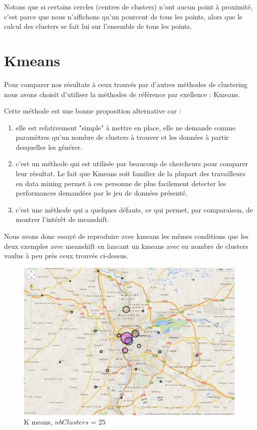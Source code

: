 Notons que si certains cercles (centres de clusters) n'ont aucun point à proximité, c'est parce que nous n'affichons qu'un pourcent de tous les points, alors que le calcul des clusters se fait lui sur l'ensemble de tous les points.

\newpage
\section{Kmeans}

Pour comparer nos résultats à ceux trouvés par d'autres méthodes de clustering nous avons choisit d'utiliser la méthodes de référence par exellence : Kmeans.

Cette méthode est une bonne proposition alternative car :
\begin{enumerate}

  \item elle est relativement "simple" à mettre en place, elle ne demande comme paramètres qu'un nombre de clusters à trouver et les données à partir desquelles les générer. 
  \item c'est un méthode qui est utilisée par beaucoup de chercheurs pour comparer leur résultat. Le fait que Kmeans soit familier de la plupart des travailleurs en data mining permet à ces personne de plus facilement detecter les performances demandées par le jeu de données présenté.
  \item c'est une méthode qui a quelques défauts, ce qui permet, par comparaison, de montrer l'intérêt de meanshift.

\end{enumerate}
 
Nous avons donc essayé de reproduire avec kmeans les mêmes conditions que les deux exemples avec meanshift en lancant un kmeans avec en nombre de clusters voulus à peu près ceux trouvés ci-dessus.

\begin{figure}[!h]
    \centering
    \includegraphics[width=16cm]{images/Kmeans1.png}
    \caption{K means, $nbClusters $ = 25}
    \label{fig:Kmeans1}
\end{figure}

